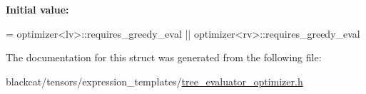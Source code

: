 {\bfseries Initial value\+:}
\begin{DoxyCode}
=
            optimizer<lv>::requires\_greedy\_eval ||
            optimizer<rv>::requires\_greedy\_eval
\end{DoxyCode}


The documentation for this struct was generated from the following file\+:\begin{DoxyCompactItemize}
\item 
blackcat/tensors/expression\+\_\+templates/\hyperlink{tree__evaluator__optimizer_8h}{tree\+\_\+evaluator\+\_\+optimizer.\+h}\end{DoxyCompactItemize}
